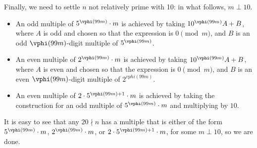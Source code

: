 Finally, we need to settle $n$ not relatively prime with 10: in what follows, $m\perp10$.
\begin{itemize}
    \item An odd multiple of $5^{\vphi(99m)}\cdot m$ is achieved by taking $10^{\vphi(99m)}A+B$, where $A$ is odd and chosen so that the expression is $0\pmod m$, and $B$ is an odd $\vphi(99m)$-digit multiple of $5^{\vphi(99m)}$.
    \item An even multiple of $2^{\vphi(99m)}\cdot m$ is achieved by taking $10^{\vphi(99m)}A+B$, where $A$ is even and chosen so that the expression is $0\pmod m$, and $B$ is an even $\vphi(99m)$-digit multiple of $2^{vphi(99m)}$.
    \item An even multiple of $2\cdot5^{\vphi(99m)+1}\cdot m$ is achieved by taking the construction for an odd multiple of $5^{\vphi(99m)}\cdot m$ and multiplying by $10$.
\end{itemize}
It is easy to see that any $20\nmid n$ has a multiple that is either of the form $5^{\vphi(99m)}\cdot m$, $2^{\vphi(99m)}\cdot m$, or $2\cdot5^{\vphi(99m)+1}\cdot m$, for some $m\perp10$, so we are done.

